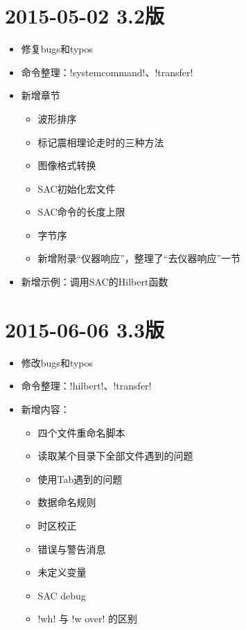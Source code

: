 \section*{2015-05-02 3.2版}
\begin{itemize}
\item 修复bugs和typos
\item 命令整理：!systemcommand!、!transfer!
\item 新增章节
    \begin{itemize}
    \item 波形排序
    \item 标记震相理论走时的三种方法
    \item 图像格式转换
    \item SAC初始化宏文件
    \item SAC命令的长度上限
    \item 字节序
    \item 新增附录``仪器响应''，整理了``去仪器响应''一节
    \end{itemize}
\item 新增示例：调用SAC的Hilbert函数
\end{itemize}

\section*{2015-06-06 3.3版}
\begin{itemize}
\item 修改bugs和typos
\item 命令整理：!hilbert!、!transfer!
\item 新增内容：
    \begin{itemize}
    \item 四个文件重命名脚本
    \item 读取某个目录下全部文件遇到的问题
    \item 使用Tab遇到的问题
    \item 数据命名规则
    \item 时区校正
    \item 错误与警告消息
    \item 未定义变量
    \item SAC debug
    \item !wh! 与 !w over! 的区别
    \end{itemize}
\end{itemize}


